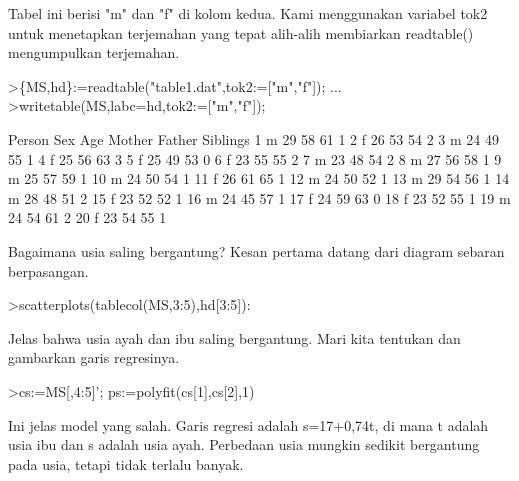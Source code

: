 \documentclass[a4paper,10pt]{article}
\begin{document}
\begin{eulernotebook}
\begin{eulercomment}
Tabel ini berisi "m" dan "f" di kolom kedua. Kami menggunakan variabel
tok2 untuk menetapkan terjemahan yang tepat alih-alih membiarkan
readtable() mengumpulkan terjemahan.
\end{eulercomment}
\begin{eulerprompt}
>\{MS,hd\}:=readtable("table1.dat",tok2:=["m","f"]);  ...
>writetable(MS,labc=hd,tok2:=["m","f"]);
\end{eulerprompt}
\begin{euleroutput}
      Person       Sex       Age    Mother    Father  Siblings
           1         m        29        58        61         1
           2         f        26        53        54         2
           3         m        24        49        55         1
           4         f        25        56        63         3
           5         f        25        49        53         0
           6         f        23        55        55         2
           7         m        23        48        54         2
           8         m        27        56        58         1
           9         m        25        57        59         1
          10         m        24        50        54         1
          11         f        26        61        65         1
          12         m        24        50        52         1
          13         m        29        54        56         1
          14         m        28        48        51         2
          15         f        23        52        52         1
          16         m        24        45        57         1
          17         f        24        59        63         0
          18         f        23        52        55         1
          19         m        24        54        61         2
          20         f        23        54        55         1
\end{euleroutput}
\begin{eulercomment}
Bagaimana usia saling bergantung? Kesan pertama datang dari diagram
sebaran berpasangan.
\end{eulercomment}
\begin{eulerprompt}
>scatterplots(tablecol(MS,3:5),hd[3:5]):
\end{eulerprompt}
\begin{eulercomment}
Jelas bahwa usia ayah dan ibu saling bergantung. Mari kita tentukan
dan gambarkan garis regresinya.
\end{eulercomment}
\begin{eulerprompt}
>cs:=MS[,4:5]'; ps:=polyfit(cs[1],cs[2],1)
\end{eulerprompt}
\begin{euleroutput}
  [17.3789,  0.740964]
\end{euleroutput}
\begin{eulercomment}
Ini jelas model yang salah. Garis regresi adalah s=17+0,74t, di mana t
adalah usia ibu dan s adalah usia ayah. Perbedaan usia mungkin sedikit
bergantung pada usia, tetapi tidak terlalu banyak.


\end{eulercomment}
\end{eulernotebook}
\end{document}
